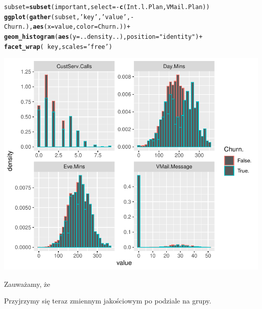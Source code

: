 \documentclass{article}\usepackage[]{graphicx}\usepackage[]{color}
\makeatletter
\def\maxwidth{ %
  \ifdim\Gin@nat@width>\linewidth
    \linewidth
  \else
    \Gin@nat@width
  \fi
}
\newcommand{\hlstr}[1]{\textcolor[rgb]{0.192,0.494,0.8}{#1}}%
\newcommand{\hlopt}[1]{\textcolor[rgb]{0,0,0}{#1}}%
\newcommand{\hlstd}[1]{\textcolor[rgb]{0.345,0.345,0.345}{#1}}%
\newcommand{\hlkwb}[1]{\textcolor[rgb]{0.69,0.353,0.396}{#1}}%
\newcommand{\hlkwc}[1]{\textcolor[rgb]{0.333,0.667,0.333}{#1}}%
\newcommand{\hlkwd}[1]{\textcolor[rgb]{0.737,0.353,0.396}{\textbf{#1}}}%
\newenvironment{kframe}{%
 \def\at@end@of@kframe{}%
 \ifinner\ifhmode%
  \def\at@end@of@kframe{\end{minipage}}%
  \begin{minipage}{\columnwidth}%
 \fi\fi%
 \def\FrameCommand##1{\hskip\@totalleftmargin \hskip-\fboxsep
 \colorbox{shadecolor}{##1}\hskip-\fboxsep
     \hskip-\linewidth \hskip-\@totalleftmargin \hskip\columnwidth}%
 \MakeFramed {\advance\hsize-\width
   \@totalleftmargin\z@ \linewidth\hsize
   \@setminipage}}%
 {\par\unskip\endMakeFramed%
 \at@end@of@kframe}
\newenvironment{knitrout}{}{} %
\makeatother
\begin{document}
\begin{knitrout}
\color{fgcolor}\begin{kframe}
\begin{alltt}
\hlstd{subset} \hlkwb{=} \hlkwd{subset}\hlstd{(important,} \hlkwc{select}\hlstd{=}\hlopt{-}\hlkwd{c}\hlstd{(Int.l.Plan, VMail.Plan))}
\hlkwd{ggplot}\hlstd{(}\hlkwd{gather}\hlstd{(subset,} \hlstr{'key'}\hlstd{,} \hlstr{'value'}\hlstd{,} \hlopt{-}\hlstd{Churn.),} \hlkwd{aes}\hlstd{(}\hlkwc{x}\hlstd{=value,} \hlkwc{color}\hlstd{=Churn.))} \hlopt{+}
  \hlkwd{geom_histogram}\hlstd{(}\hlkwd{aes}\hlstd{(}\hlkwc{y}\hlstd{=..density..),} \hlkwc{position}\hlstd{=}\hlstr{"identity"}\hlstd{)} \hlopt{+}
  \hlkwd{facet_wrap}\hlstd{(}\hlopt{~}\hlstd{key,} \hlkwc{scales}\hlstd{=}\hlstr{'free'}\hlstd{)}
\end{alltt}
\end{kframe}

{\centering \includegraphics[width=\maxwidth]{figure/Histogramy_z_podzialem_na_grupy-1} 

}



\end{knitrout}

Zauważamy, że 

\vspace{0.3cm}

Przyjrzymy się teraz zmiennym jakościowym po podziale na grupy.
\end{document}
